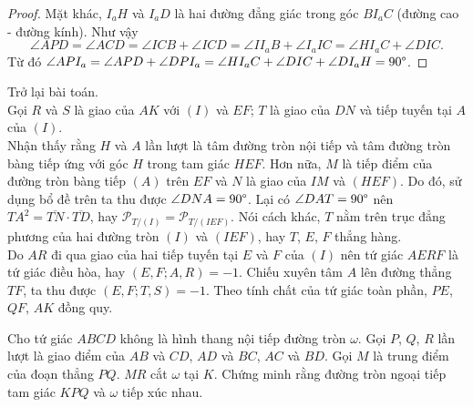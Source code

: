 \begin{solution}
\begin{enumerate}
\begin{proof}
                    Mặt khác, \(I_aH\) và \(I_aD\) là hai đường đẳng giác trong góc \(BI_aC\) (đường cao - đường kính). Như vậy
                    \[\angle APD = \angle ACD = \angle ICB + \angle ICD = \angle II_aB + \angle I_aIC = \angle HI_aC + \angle DIC.\]
                    Từ đó \(\angle API_a = \angle APD + \angle DPI_a = \angle HI_aC + \angle DIC + \angle DI_aH = 90 \degree\).
                \end{proof}
                Trở lại bài toán.\\
                Gọi \(R\) và \(S\) là giao của \(AK\) với \((I)\) và \(EF\); \(T\) là giao của \(DN\) và tiếp tuyến tại \(A\) của \((I)\).\\
                Nhận thấy rằng \(H\) và \(A\) lần lượt là tâm đường tròn nội tiếp và tâm đường tròn bàng tiếp ứng với góc \(H\) trong tam giác \(HEF\). Hơn nữa, \(M\) là tiếp điểm của đường tròn bàng tiếp \((A)\) trên \(EF\) và \(N\) là giao của \(IM\) và \((HEF)\). Do đó, sử dụng bổ đề trên ta thu được \(\angle DNA = 90 \degree\). Lại có \(\angle DAT = 90 \degree\) nên \(TA^2 = \overline{TN} \cdot \overline{TD}\), hay \(\mathcal{P}_{T/(I)} = \mathcal{P}_{T/(IEF)}\). Nói cách khác, \(T\) nằm trên trục đẳng phương của hai đường tròn \((I)\) và \((IEF)\), hay \(T\), \(E\), \(F\) thẳng hàng.\\
                Do \(AR\) đi qua giao của hai tiếp tuyến tại \(E\) và \(F\) của \((I)\) nên tứ giác \(AERF\) là tứ giác điều hòa, hay \((E,F;A,R) = -1\). Chiếu xuyên tâm \(A\) lên đường thẳng \(TF\), ta thu được \((E,F;T,S) = -1\). Theo tính chất của tứ giác toàn phần, \(PE\), \(QF\), \(AK\) đồng quy.
            \end{enumerate}
        \end{solution}

        \begin{problem}
            Cho tứ giác \(ABCD\) không là hình thang nội tiếp đường tròn \(\omega\). Gọi \(P\), \(Q\), \(R\) lần lượt là giao điểm của \(AB\) và \(CD\), \(AD\) và \(BC\), \(AC\) và \(BD\). Gọi \(M\) là trung điểm của đoạn thẳng \(PQ\). \(MR\) cắt \(\omega\) tại \(K\). Chứng minh rằng đường tròn ngoại tiếp tam giác \(KPQ\) và \(\omega\) tiếp xúc nhau.
        \end{problem}

